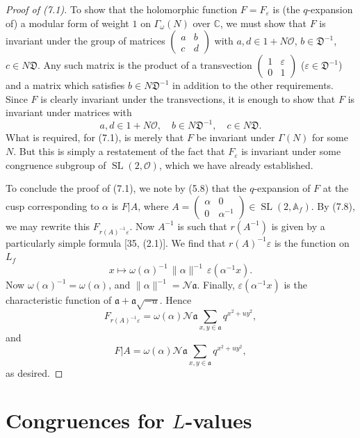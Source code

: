 \documentclass[12pt,a4paper]{article}
\theoremstyle{plain}
\theoremstyle{definition}
\theoremstyle{remark}
\DeclareMathOperator{\SL}{SL}
\begin{document}
\begin{proof}[Proof of (7.1)]
To show that the holomorphic function $F = F_\varepsilon$ is (the $q$-expansion of) a modular form of weight $1$ on $\Gamma_\omega(N)$ over $\mathbb{C}$, we must show that $F$ is invariant under the group of matrices $\begin{pmatrix} a & b \\ c & d \end{pmatrix}$ with $a, d \in 1 + N\mathcal{O}$, $b \in \mathfrak{D}^{-1}$, $c \in N\mathfrak{D}$. Any such matrix is the product of a transvection $\begin{pmatrix} 1 & \varepsilon \\ 0 & 1 \end{pmatrix}$ ($\varepsilon \in \mathfrak{D}^{-1}$) and a matrix which satisfies $b \in N\mathfrak{D}^{-1}$ in addition to the other requirements. Since $F$ is clearly invariant under the transvections, it is enough to show that $F$ is invariant under matrices with
\[
a, d \in 1 + N\mathcal{O}, \quad b \in N\mathfrak{D}^{-1}, \quad c \in N\mathfrak{D}.
\]
What is required, for (7.1), is merely that $F$ be invariant under $\Gamma(N)$ for some $N$. But this is simply a restatement of the fact that $F_\varepsilon$ is invariant under some congruence subgroup of $\SL(2, \mathcal{O})$, which we have already established.

To conclude the proof of (7.1), we note by (5.8) that the $q$-expansion of $F$ at the cusp corresponding to $\alpha$ is $F|A$, where $A = \begin{pmatrix} \alpha & 0 \\ 0 & \alpha^{-1} \end{pmatrix} \in \SL(2, \mathbb{A}_f)$. By (7.8), we may rewrite this $F_{r(A)^{-1}\varepsilon}$. Now $A^{-1}$ is such that $r(A^{-1})$ is given by a particularly simple formula [35, (2.1)]. We find that $r(A)^{-1}\varepsilon$ is the function on $L_f$
\[
x \mapsto \omega(\alpha)^{-1} \, \|\alpha\|^{-1} \, \varepsilon(\alpha^{-1} x).
\]
Now $\omega(\alpha)^{-1} = \omega(\alpha)$, and $\|\alpha\|^{-1} = \mathcal{N}\mathfrak{a}$. Finally, $\varepsilon(\alpha^{-1}x)$ is the characteristic function of $\mathfrak{a} + \mathfrak{a}\sqrt{-u}$. Hence
\[
F_{r(A)^{-1}\varepsilon} = \omega(\alpha) \mathcal{N}\mathfrak{a} \sum_{x,y \in \mathfrak{a}} q^{x^2 + u y^2},
\]
and
\[
F|A = \omega(\alpha) \mathcal{N}\mathfrak{a} \sum_{x,y \in \mathfrak{a}} q^{x^2 + u y^2},
\]
as desired.
\end{proof}


\section{Congruences for $L$-values}\label{sec:8}
\end{document}

